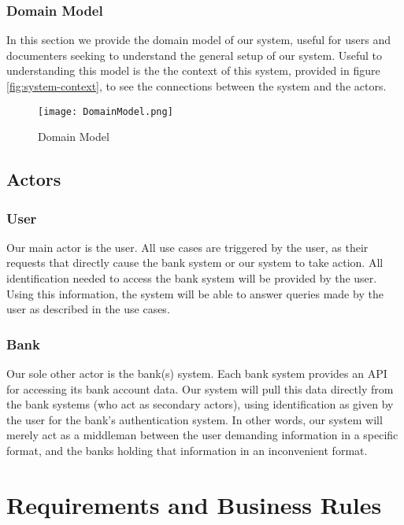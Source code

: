 \documentclass[11pt]{article}
\newcounter{use case ID}
\newcounter{req ID}
\begin{document}
\subsubsection{Domain Model}

In this section we provide the domain model of our system, useful for users and documenters seeking to understand the general setup of our system. Useful to understanding this model is the the context of this system, provided in figure \ref{fig:system-context}, to see the connections between the system and the actors.

\begin{figure}[H]
    \texttt{[image: DomainModel.png]}
    \centering
    \caption{Domain Model}
    \label{fig:domain-model}
\end{figure}

\clearpage


\subsection{Actors} \label{actors}
\subsubsection{User}
Our main actor is the user. All use cases are triggered by the user, as their requests that directly cause the bank system or our system to take action. All identification needed to access the bank system will be provided by the user. Using this information, the system will be able to answer queries made by the user as described in the use cases.
\subsubsection{Bank}
Our sole other actor is the bank(s) system. Each bank system provides an API for accessing its bank account data. Our system will pull this data directly from the bank systems (who act as secondary actors), using identification as given by the user for the bank's authentication system. In other words, our system will merely act as a middleman between the user demanding information in a specific format, and the banks holding that information in an inconvenient format.


\section{Requirements and Business Rules} \label{nonfunc req}
\end{document}
